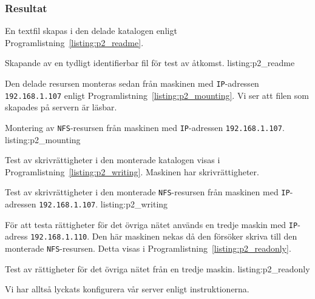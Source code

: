 \subsubsection{Resultat}

En textfil skapas i den delade katalogen enligt 
Programlistning~\ref{listing:p2_readme}.

            {Skapande av en tydligt identifierbar fil för test av åtkomst.}
            {listing:p2_readme}

Den delade resursen monteras sedan från maskinen med \texttt{IP}-adressen
\texttt{192.168.1.107} enligt Programlistning~\ref{listing:p2_mounting}.
Vi ser att filen som skapades på servern är läsbar.

            {Montering av \texttt{NFS}-resursen från maskinen med
             \texttt{IP}-adressen \texttt{192.168.1.107}.}
            {listing:p2_mounting}

Test av skrivrättigheter i den monterade katalogen visas i
Programlistning~\ref{listing:p2_writing}. Maskinen har skrivrättigheter.

            {Test av skrivrättigheter i den monterade \texttt{NFS}-resursen 
             från maskinen med \texttt{IP}-adressen \texttt{192.168.1.107}.}
            {listing:p2_writing}

För att testa rättigheter för det övriga nätet används en tredje maskin med
\texttt{IP}-adress \texttt{192.168.1.110}. Den här maskinen nekas då den
försöker skriva till den monterade \texttt{NFS}-resursen.
Detta visas i Programlistning~\ref{listing:p2_readonly}.

            {Test av rättigheter för det övriga nätet från en tredje maskin.}
            {listing:p2_readonly}


Vi har alltså lyckats konfigurera vår server enligt instruktionerna.
